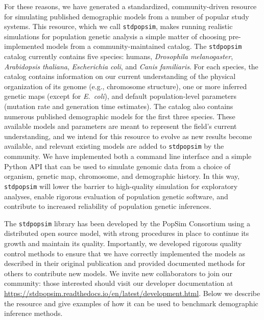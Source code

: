 \documentclass[12pt,halfline,a4paper]{ouparticle}
\newcommand{\stdpopsim}{\texttt{stdpopsim}\xspace}
\begin{document}
For these reasons, we have generated a standardized, community-driven resource
for simulating published demographic models from a number of popular study systems.
This resource, which we call \stdpopsim, makes running
realistic simulations for population genetic analysis a simple matter of
choosing pre-implemented models from a community-maintained catalog.
The \stdpopsim catalog currently contains five species: humans,
\textit{Drosophila melanogaster}, \textit{Arabidopsis thaliana},
\textit{Escherichia coli}, and \textit{Canis familiaris}.
For each species, the catalog contains information on our current understanding of
the physical organization of its genome (e.g., chromosome structure),
one or more inferred genetic maps (except for \textit{E.~coli}),
and default population-level parameters (mutation rate and generation time estimates).
The catalog also contains numerous published demographic models for the first three species.
These available models and parameters are meant to represent the field's current understanding,
and we intend for this resource to evolve as new results become available, and relevant
existing models are added to \stdpopsim by the community.
We have implemented both a command line interface and a simple Python API
that can be used to simulate genomic data
from a choice of organism, genetic map, chromosome, and demographic history.
In this way, \stdpopsim will lower the barrier to high-quality simulation for exploratory analyses,
enable rigorous evaluation of population genetic software,
and contribute to increased reliability of population genetic inferences.


The \stdpopsim library has been developed by the PopSim Consortium using a
distributed open source model, with strong procedures in place
to continue its growth and maintain its quality.
Importantly, we developed rigorous quality control methods to ensure that we have
correctly implemented the models as described in their original publication
and provided documented methods for others to contribute new models.
We invite new collaborators to join our community:
those interested should visit our developer documentation at
\url{https://stdpopsim.readthedocs.io/en/latest/development.html}.
Below we describe the resource and give
examples of how it can be used to benchmark demographic inference methods.
\end{document}
